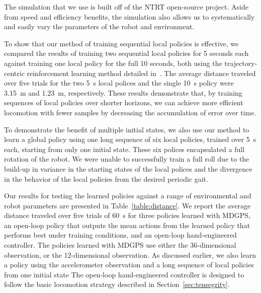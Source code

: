The \SB{} simulation that we use is built off of the NTRT open-source project.
Aside from speed and efficiency benefits, the simulation also allows us to
systematically and easily vary the parameters of the robot and environment.

To show that our method of training sequential local policies is effective, we
compared the results of training two sequential local policies for 5 seconds
each against training one local policy for the full 10 seconds, both using the
trajectory-centric reinforcement learning method detailed in~\cite{la-lnnpg-14}.
The average distance traveled over five trials for the two \SI{5}{\second} local polices and the 
single \SI{10}{\second} policy were \SI{3.15}{\meter} and \SI{1.23}{\meter}, respectively.
These results demonstrate that, by training sequences
of local policies over shorter horizons, we can achieve more efficient
locomotion with fewer samples by decreasing the accumulation of error over time.

To demonstrate the benefit of multiple initial states, we also use our method to
learn a global policy using one long sequence of six local policies, trained
over \SI{5}{\second} each, starting from only one initial state. 
These six polices encapsulated a full rotation of the robot.
We were unable to
successfully train %
a full roll due to the
build-up in variance in the starting states of the local polices and the
divergence in the behavior of the local policies from the desired periodic gait.

Our results for testing the learned policies against a range of environmental
and robot parameters are presented in Table~\ref{table:distance}. We report the
average distance traveled over five trials of \SI{60}{\second} for three policies
learned with MDGPS, an open-loop policy that outputs the mean actions from the
learned policy that performs best under training conditions, and an open-loop
hand-engineered controller. The policies learned with MDGPS use either the
36-dimensional observation, or the 12-dimensional observation. 
As discussed earlier, we also learn a policy using the accelerometer
observation and a long sequence of local policies from one initial state
The open-loop hand-engineered controller is
designed to follow the basic locomotion strategy described in
Section~\ref{sec:tensegrity}.

